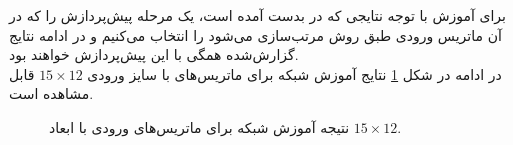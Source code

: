 برای آموزش با توجه نتایجی که در \cite{azer2020tumor} بدست آمده است، یک مرحله پیش‌پردازش را که در آن ماتریس ورودی طبق روش \cite{gusfield1997algorithms} مرتب‌سازی می‌شود را انتخاب می‌کنیم و در ادامه نتایج گزارش‌شده همگی با این پیش‌پردازش خواهند بود.
\\
در ادامه در شکل \ref{fig:ch_er:td3_learning} نتایج آموزش شبکه برای ماتریس‌های با سایز ورودی $15\times 12$ قابل مشاهده است.
\begin{figure}[!ht]
	\hfill
	\caption{نتیجه آموزش شبکه برای ماتریس‌های ورودی با ابعاد $15\times 12$.}
	\label{fig:ch_er:td3_learning}
\end{figure}


